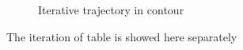 \begin{figure}[H]
{}
\quad
{}
\quad
{}
\caption{ Iterative trajectory in contour}
\end{figure}
The iteration of table is showed here separately
